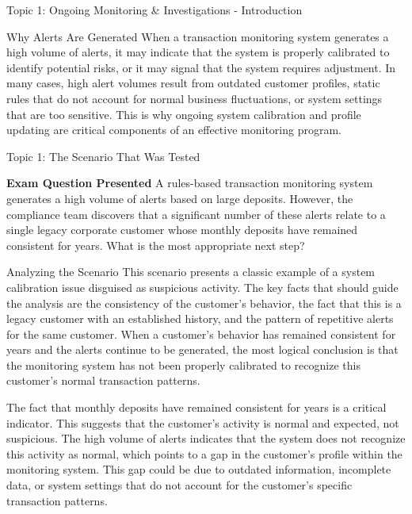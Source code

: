 \documentclass[8pt]{beamer}  %
\begin{document}
\begin{frame}{Topic 1: Ongoing Monitoring \& Investigations - Introduction}
\begin{block}{\large Why Alerts Are Generated}
			When a transaction monitoring system generates a high volume of alerts, it may indicate that the system is properly calibrated to identify potential risks, or it may signal that the system requires adjustment. In many cases, high alert volumes result from outdated customer profiles, static rules that do not account for normal business fluctuations, or system settings that are too sensitive. This is why ongoing system calibration and profile updating are critical components of an effective monitoring program.
		\end{block}
	\end{frame}
	
	\begin{frame}{Topic 1: The Scenario That Was Tested}
		\begin{block}{\large \textbf{Exam Question Presented}}
			A rules-based transaction monitoring system generates a high volume of alerts based on large deposits. However, the compliance team discovers that a significant number of these alerts relate to a single legacy corporate customer whose monthly deposits have remained consistent for years. What is the most appropriate next step?
		\end{block}
		
		\vspace{0.2cm}
		\begin{block}{\large Analyzing the Scenario}
			This scenario presents a classic example of a system calibration issue disguised as suspicious activity. The key facts that should guide the analysis are the consistency of the customer's behavior, the fact that this is a legacy customer with an established history, and the pattern of repetitive alerts for the same customer. When a customer's behavior has remained consistent for years and the alerts continue to be generated, the most logical conclusion is that the monitoring system has not been properly calibrated to recognize this customer's normal transaction patterns.
			
			The fact that monthly deposits have remained consistent for years is a critical indicator. This suggests that the customer's activity is normal and expected, not suspicious. The high volume of alerts indicates that the system does not recognize this activity as normal, which points to a gap in the customer's profile within the monitoring system. This gap could be due to outdated information, incomplete data, or system settings that do not account for the customer's specific transaction patterns.
			

\end{block}
\end{frame}
\end{document}
